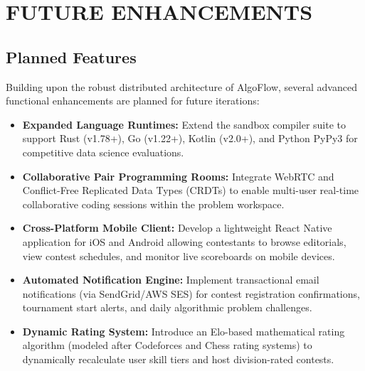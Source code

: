 \documentclass[12pt,a4paper]{report}
\begin{document}
\clearpage


\chapter{FUTURE ENHANCEMENTS}

\section{Planned Features}
Building upon the robust distributed architecture of AlgoFlow, several advanced functional enhancements are planned for future iterations:
\begin{itemize}[leftmargin=*]
  \item \textbf{Expanded Language Runtimes:} Extend the sandbox compiler suite to support Rust (v1.78+), Go (v1.22+), Kotlin (v2.0+), and Python PyPy3 for competitive data science evaluations.
  \item \textbf{Collaborative Pair Programming Rooms:} Integrate WebRTC and Conflict-Free Replicated Data Types (CRDTs) to enable multi-user real-time collaborative coding sessions within the problem workspace.
  \item \textbf{Cross-Platform Mobile Client:} Develop a lightweight React Native application for iOS and Android allowing contestants to browse editorials, view contest schedules, and monitor live scoreboards on mobile devices.
  \item \textbf{Automated Notification Engine:} Implement transactional email notifications (via SendGrid/AWS SES) for contest registration confirmations, tournament start alerts, and daily algorithmic problem challenges.
  \item \textbf{Dynamic Rating System:} Introduce an Elo-based mathematical rating algorithm (modeled after Codeforces and Chess rating systems) to dynamically recalculate user skill tiers and host division-rated contests.
\end{itemize}
\end{document}
